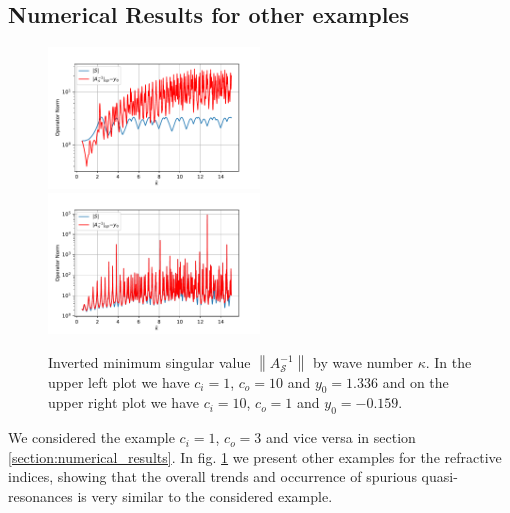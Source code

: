 \documentclass[12pt,journal,compsoc, onecolumn]{IEEEtran}
\begin{document}
\subsection{Numerical Results for other examples}
\begin{figure}
    \includegraphics[width=0.5\textwidth]{InvertedMinimumSingularValuec_i1,0c_o10,0N_30eta1,0start_0,5end_15shiftFirstValue_Trueremove_Falseindexrange_-30,0-0,0_y_0_1,3358484167389728.pdf}
    \includegraphics[width=0.5\textwidth]{InvertedMinimumSingularValuec_i10,0c_o1,0N_30eta1,0start_0,5end_15shiftFirstValue_Trueremove_Falseindexrange_-30,0-0,0_y_0_-0,15938792417683234.pdf} 
    \caption{Inverted minimum singular value $\left\|A_{\mathcal{S}}^{-1}\right\|$ by wave number $\kappa$. 
    In the upper left plot we have $c_i = 1$, $c_o = 10$ and $y_0 = 1.336$
    and on the upper right plot we have $c_i = 10$, $c_o = 1$ and $y_0 = -0.159$.}
   \label{fig:c_other_results}
\end{figure}
\noindent
We considered the example $c_i = 1$, $c_o = 3$ and vice versa in section \ref{section:numerical_results}. In fig. \ref{fig:c_other_results} we present other examples for the refractive indices, showing that the overall trends and occurrence of spurious quasi-resonances is very similar to the considered example. \\
\end{document}
